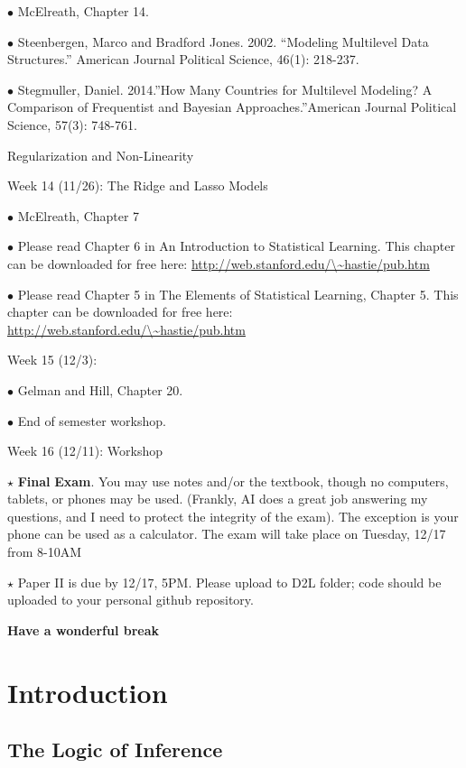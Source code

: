 \documentclass[
]{book}
\begin{document}
\(\bullet\) McElreath, Chapter 14.

\(\bullet\) Steenbergen, Marco and Bradford Jones. 2002. ``Modeling Multilevel Data Structures.'' American Journal Political Science, 46(1): 218-237.

\(\bullet\) Stegmuller, Daniel. 2014.''How Many Countries for Multilevel Modeling? A Comparison of Frequentist and Bayesian Approaches.''American Journal Political Science, 57(3): 748-761.

Regularization and Non-Linearity

Week 14 (11/26): The Ridge and Lasso Models

\(\bullet\) McElreath, Chapter 7

\(\bullet\) Please read Chapter 6 in An Introduction to Statistical Learning. This chapter can be downloaded for free here: \href{http://web.stanford.edu/~hastie/pub.htm}{http://web.stanford.edu/\textbackslash\textasciitilde hastie/pub.htm}

\(\bullet\) Please read Chapter 5 in The Elements of Statistical Learning, Chapter 5. This chapter can be downloaded for free here: \href{http://web.stanford.edu/~hastie/pub.htm}{http://web.stanford.edu/\textbackslash\textasciitilde hastie/pub.htm}

Week 15 (12/3):

\(\bullet\) Gelman and Hill, Chapter 20.

\(\bullet\) End of semester workshop.

Week 16 (12/11): Workshop

\(\star\) \textbf{Final} \textbf{Exam}. You may use notes and/or the textbook, though no computers, tablets, or phones may be used. (Frankly, AI does a great job answering my questions, and I need to protect the integrity of the exam). The exception is your phone can be used as a calculator. The exam will take place on Tuesday, 12/17 from 8-10AM

\(\star\) Paper II is due by 12/17, 5PM. Please upload to D2L folder; code should be uploaded to your personal github repository.

\textbf{Have a wonderful break}

\chapter{Introduction}\label{introduction}

\section{The Logic of Inference}\label{the-logic-of-inference}
\end{document}

